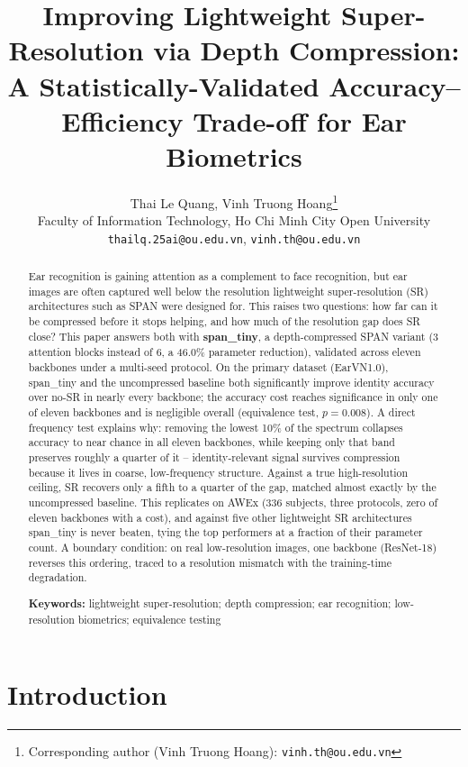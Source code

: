 \documentclass[11pt]{article}
\title{Improving Lightweight Super-Resolution via Depth Compression:\\
A Statistically-Validated Accuracy--Efficiency Trade-off for Ear Biometrics}
\author{
  Thai Le Quang, Vinh Truong Hoang\thanks{Corresponding author (Vinh Truong Hoang): \texttt{vinh.th@ou.edu.vn}}\\[2mm]
  \normalsize Faculty of Information Technology, Ho Chi Minh City Open University\\
  \normalsize \texttt{thailq.25ai@ou.edu.vn}, \texttt{vinh.th@ou.edu.vn}
}
\date{}
\begin{document}
\maketitle

\begin{abstract}
Ear recognition is gaining attention as a complement to face recognition, but ear images are often captured well below the resolution lightweight super-resolution (SR) architectures such as SPAN were designed for. This raises two questions: how far can it be compressed before it stops helping, and how much of the resolution gap does SR close? This paper answers both with \textbf{span\_tiny}, a depth-compressed SPAN variant (3 attention blocks instead of 6, a 46.0\% parameter reduction), validated across eleven backbones under a multi-seed protocol. On the primary dataset (EarVN1.0), span\_tiny and the uncompressed baseline both significantly improve identity accuracy over no-SR in nearly every backbone; the accuracy cost reaches significance in only one of eleven backbones and is negligible overall (equivalence test, $p=0.008$). A direct frequency test explains why: removing the lowest 10\% of the spectrum collapses accuracy to near chance in all eleven backbones, while keeping only that band preserves roughly a quarter of it -- identity-relevant signal survives compression because it lives in coarse, low-frequency structure. Against a true high-resolution ceiling, SR recovers only a fifth to a quarter of the gap, matched almost exactly by the uncompressed baseline. This replicates on AWEx (336 subjects, three protocols, zero of eleven backbones with a cost), and against five other lightweight SR architectures span\_tiny is never beaten, tying the top performers at a fraction of their parameter count. A boundary condition: on real low-resolution images, one backbone (ResNet-18) reverses this ordering, traced to a resolution mismatch with the training-time degradation.

\vspace{2mm}
\noindent\textbf{Keywords:} lightweight super-resolution; depth compression; ear recognition; low-resolution biometrics; equivalence testing
\end{abstract}

\section{Introduction}
\end{document}
